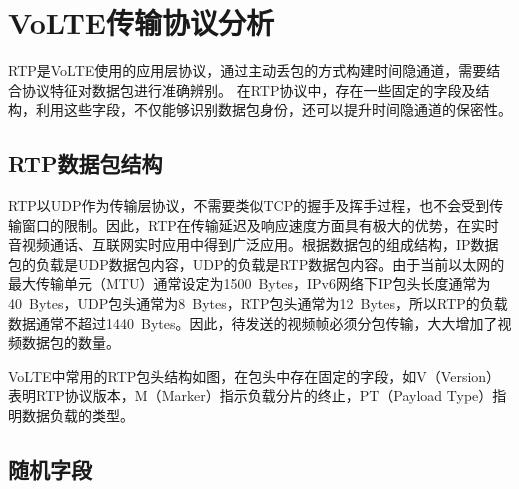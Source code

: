 \section{VoLTE传输协议分析}
\label{chap:backinfo:rtp}

RTP是VoLTE使用的应用层协议，通过主动丢包的方式构建时间隐通道，需要结合协议特征对数据包进行准确辨别。
在RTP协议中，存在一些固定的字段及结构，利用这些字段，不仅能够识别数据包身份，还可以提升时间隐通道的保密性。

\subsection{RTP数据包结构}
\label{chap:backinfo:rtp:struct}

RTP以UDP作为传输层协议，不需要类似TCP的握手及挥手过程，也不会受到传输窗口的限制。因此，RTP在传输延迟及响应速度方面具有极大的优势，在实时音视频通话、互联网实时应用中得到广泛应用。根据数据包的组成结构，IP数据包的负载是UDP数据包内容，UDP的负载是RTP数据包内容。由于当前以太网的最大传输单元（MTU）通常设定为{1500\ Bytes}，IPv6网络下IP包头长度通常为{40\ Bytes}，UDP包头通常为{8\ Bytes}，RTP包头通常为{12\ Bytes}，所以RTP的负载数据通常不超过{1440\ Bytes}。因此，待发送的视频帧必须分包传输，大大增加了视频数据包的数量。


VoLTE中常用的RTP包头结构如图，在包头中存在固定的字段，如V（{Version}）表明RTP协议版本，M（{Marker}）指示负载分片的终止，PT（{Payload Type}）指明数据负载的类型。

\subsection{随机字段}
\label{chap:backinfo:rtp:random}


